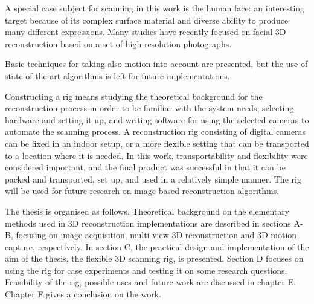 A special case subject for scanning in this work is the human face: an interesting target because of its complex surface material and diverse ability to produce many different expressions.
Many studies have recently focused on facial 3D reconstruction based on a set of high resolution photographs.


Basic techniques for taking also motion into account are presented, but the use of state-of-the-art algorithms is left for future implementations.


Constructing a rig means studying the theoretical background for the reconstruction process in order to be familiar with the system needs, selecting hardware and setting it up, and writing software for using the selected cameras to automate the scanning process.
A reconstruction rig consisting of digital cameras can be fixed in an indoor setup, or a more flexible setting that can be transported to a location where it is needed.
In this work, transportability and flexibility were considered important, and the final product was successful in that it can be packed and transported, set up, and used in a relatively simple manner.
The rig will be used for future research on image-based reconstruction algorithms.


The thesis is organised as follows.
Theoretical background on the elementary methods used in 3D reconstruction implementations are described in sections A-B, focusing on image acquisition, multi-view 3D reconstruction and 3D motion capture, respectively.
In section C, the practical design and implementation of the aim of the thesis, the flexible 3D scanning rig, is presented.
Section D focuses on using the rig for case experiments and testing it on some research questions.
Feasibility of the rig, possible uses and future work are discussed in chapter E.
Chapter F gives a conclusion on the work.
